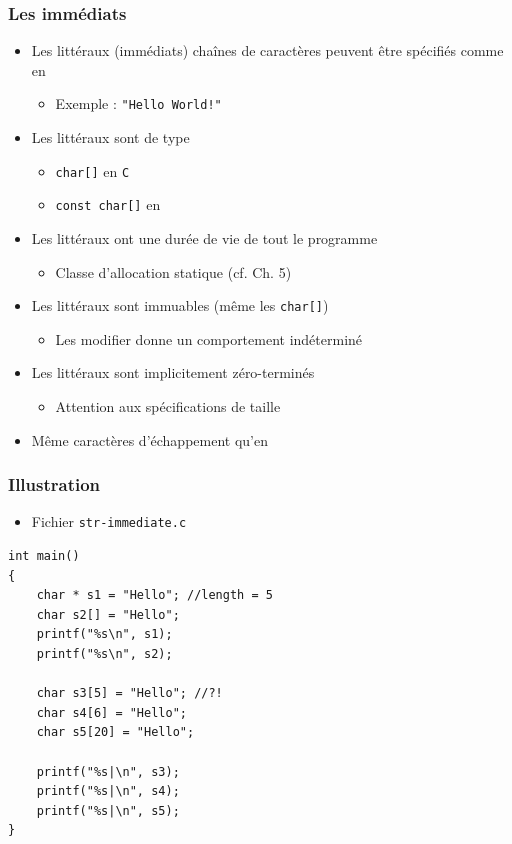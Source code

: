 \begin{frame}
\frametitle{Les immédiats}
\begin{itemize}[<+->]
\item Les littéraux (immédiats) chaînes de caractères peuvent être spécifiés comme en \java
	\begin{itemize}
	\item Exemple : \lstinline|"Hello World!"|
	\end{itemize}
\item Les littéraux sont de type
	\begin{itemize}
	\item \lstinline|char[]| en \texttt{C}
	\item \lstinline|const char[]| en \cpp
	\end{itemize}
\item Les littéraux ont une durée de vie de tout le programme
	\begin{itemize}
	\item Classe d'allocation statique (cf. Ch. 5)
	\end{itemize}
\item Les littéraux sont immuables (même les \lstinline|char[]|)
	\begin{itemize}
	\item Les modifier donne un comportement indéterminé
	\end{itemize}
\item Les littéraux sont implicitement zéro-terminés
	\begin{itemize}
	\item Attention aux spécifications de taille
	\end{itemize}
\item Même caractères d'échappement qu'en \java
\end{itemize}
\end{frame}

\begin{frame}[containsverbatim]
\frametitle{Illustration}
\begin{itemize}
\item Fichier \texttt{str-immediate.c}
\end{itemize}
\begin{lstlisting}
int main()
{
	char * s1 = "Hello"; //length = 5
	char s2[] = "Hello";
	printf("%s\n", s1);
	printf("%s\n", s2);

	char s3[5] = "Hello"; //?!
	char s4[6] = "Hello";
	char s5[20] = "Hello";

	printf("%s|\n", s3);
	printf("%s|\n", s4);
	printf("%s|\n", s5);	
}
\end{lstlisting}
\end{frame}

